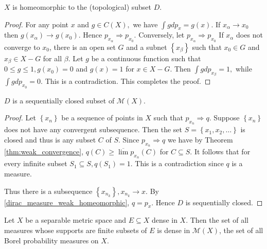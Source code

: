 \begin{lem}
	\label{dirac_measure_weak_homeomorphic}
	\( X \) is homeomorphic to the (topological) subset $D$.
\end{lem}

\begin{proof}
	For any point \( x \) and \( g \in C ( X ) , \) we have \( \int g d p _ { x } = g ( x ) \). If \( x _ { \alpha } \rightarrow x _ { 0 } \) then \( g \left( x _ { \alpha } \right) \rightarrow g \left( x _ { 0 } \right) . \) Hence \( p _ { x _ { \alpha } } \Rightarrow p _ { x _ { 0 } } \). Conversely, let \( p _ { x _ { \alpha } } \Rightarrow p _ { x _ { 0 } } \) If \( x _ { \alpha } \) does not converge to \( x _ { 0 } \), there is an open set \( G \) and a subnet \( \left\{ x _ { \beta } \right\} \) such that \( x _ { 0 } \in G \) and \( x _ { \beta } \in X - G \) for all \( \beta . \) Let \( g \) be a continuous function such that \( 0 \leqslant g \leqslant 1 , g \left( x _ { 0 } \right) = 0 \) and \( g ( x ) = 1 \) for \( x \in X - G \). Then \( \int g d p _ { x _ { \beta } } = 1 , \) while \( \int g d p _ { x _ { 0 } } = 0 . \) This is a contradiction. This completes the proof.
\end{proof}

\begin{lem}
	\( D \) is a sequentially closed subset of \( \mathscr { M } ( X ) \).
\end{lem}

\begin{proof}
	Let \( \left\{ x _ { n } \right\} \) be a sequence of points in \( X \) such that \( p _ { x _ { n } } \Rightarrow q \). Suppose \( \left\{ x _ { n } \right\} \) does not have any convergent subsequence. Then the set \( S = \left\{ x _ { 1 } , x _ { 2 } , \ldots \right\} \) is closed and thus is any subset \( C \) of \( S . \) Since \( p _ { x _ { n } } \Rightarrow q \) we have by Theorem \cref{thm:weak_convergence}, \( q ( C ) \geqslant \overline { \lim } p _ { x _ { n } } ( C ) \) for \( C \subseteq S \). It follows that for every infinite subset \( S _ { 1 } \subseteq S , q \left( S _ { 1 } \right) = 1 \). This is a contradiction since \( q \) is a measure.

	Thus there is a subsequence \( \left\{ x _ { n _ { k } } \right\} , x _ { n _ { k } } \rightarrow x . \) By \cref{dirac_measure_weak_homeomorphic}, \( q = p _ { x } \). Hence \( D \) is sequentially closed.
\end{proof}


\begin{thm}
	\label{finite_support_approximation}
	Let \( X \) be a separable metric space and \( E \subseteq X \) dense in \( X  \). Then the set of all measures whose supports are finite subsets of \( E \) is dense in \( \mathscr{ M } ( X ) \), the set of all Borel probability measures on $X$.
\end{thm}

